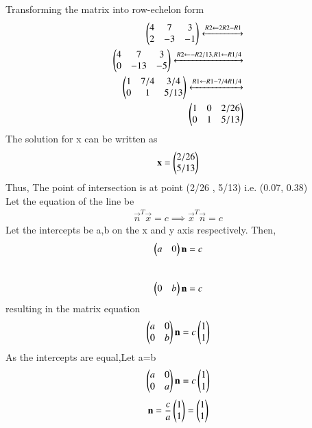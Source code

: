 \documentclass[journal,12pt,twocolumn]{IEEEtran}
\begin{document}
\begin{flushleft}
    Transforming the matrix into row-echelon form \\
    \begin{align}
    \begin{pmatrix}
    4 & 7 & 3 \\
    2 & -3 & -1
    \end{pmatrix}
      \xleftrightarrow[]{R2 \leftarrow 2R2 - R1 } \nonumber \\
    \begin{pmatrix}
    4 & 7 & 3 \\
    0 & -13 & -5
    \end{pmatrix}
    \xleftrightarrow[]{R2 \leftarrow -R2/13,R1 \leftarrow R1/4} \nonumber \\
    \begin{pmatrix}
    1 & 7/4 & 3/4 \\
    0 & 1 & 5/13
    \end{pmatrix}
    \xleftrightarrow[]{R1 \leftarrow R1-7/4R1/4} \nonumber \\
    \begin{pmatrix}
    1 & 0 & 2/26 \\
    0 & 1 & 5/13
    \end{pmatrix}
    \end{align}
    The solution for x can be written as 
    \begin{equation}
    \label{expk}
    \mathbf{x} = \begin{pmatrix}2/26 \\ 5/13\end{pmatrix}
    \end{equation}
    Thus, The point of intersection is at point (2/26 , 5/13) i.e. (0.07, 0.38)\\
    Let the equation of the line be
    \begin{align}
    \label{equ}
    \vec{n}^T\vec{x} = c \implies \vec{x}^T\vec{n} = c
    \end{align}
    Let the intercepts be a,b on the x and y axis respectively. Then,
    \begin{align} 
    \begin{pmatrix}a & 0\end{pmatrix}\mathbf{n} = c
    \end{align}
    \\
    \begin{align} 
    \begin{pmatrix}0 & b\end{pmatrix}\mathbf{n} = c
    \end{align}
    resulting in the matrix equation
    \begin{equation}
    \begin{pmatrix}a & 0 \\ 0 & b\end{pmatrix}\mathbf{n} = c \begin{pmatrix}1 \\ 1\end{pmatrix}
    \end{equation}
    As the intercepts are equal,Let a=b
    \begin{equation}
    \begin{pmatrix}a & 0 \\ 0 & a\end{pmatrix}\mathbf{n} = c \begin{pmatrix}1 \\ 1\end{pmatrix}
    \end{equation}
    \begin{equation}
    \vec{n} = \frac{c}{a}\myvec{1\\1} = \myvec{1\\1}

\end{equation}
\end{flushleft}
\end{document}
